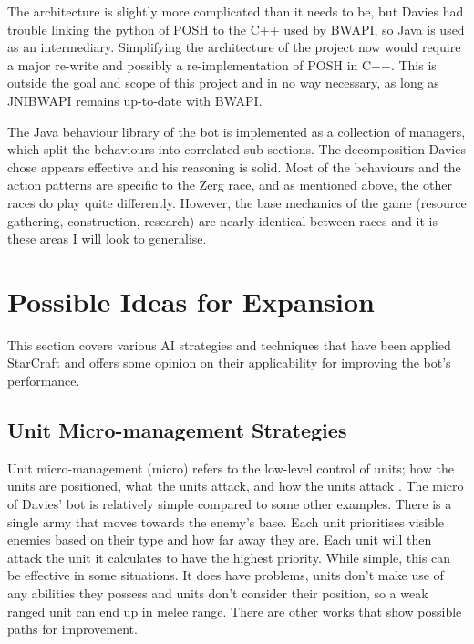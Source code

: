 \documentclass[11pt,openright,a4paper]{report}
\begin{document}
The architecture is slightly more complicated than it needs to be, but Davies had trouble linking the python of POSH to the C++ used by BWAPI, so Java is used as an intermediary. Simplifying the architecture of the project now would require a major re-write and possibly a re-implementation of POSH in C++. This is outside the goal and scope of this project and in no way necessary, as long as JNIBWAPI remains up-to-date with BWAPI.

\label{LitSrvyClass}
The Java behaviour library of the bot is implemented as a collection of managers, which split the behaviours into correlated sub-sections. The decomposition Davies chose appears effective and his reasoning is solid.  Most of the behaviours and the action patterns are specific to the Zerg race, and as mentioned above, the other races do play quite differently. However, the base mechanics of the game (resource gathering, construction, research) are nearly identical between races and it is these areas I will look to generalise.

\section{Possible Ideas for Expansion}
This section covers various AI strategies and techniques that have been applied StarCraft and offers some opinion on their applicability for improving the bot's performance.

\subsection{Unit Micro-management Strategies}
Unit micro-management (micro) refers to the low-level control of units; how the units are positioned, what the units attack, and how the units attack \cite{TLMicro}.
The micro of Davies' bot is relatively simple compared to some other examples. There is a single army that moves towards the enemy's base. Each unit prioritises visible enemies based on their type and how far away they are. Each unit will then attack the unit it calculates to have the highest priority. While simple, this can be effective in some situations. It does have problems, units don't make use of any abilities they possess and units don't consider their position, so a weak ranged unit can end up in melee range. There are other works that show possible paths for improvement.
\end{document}
